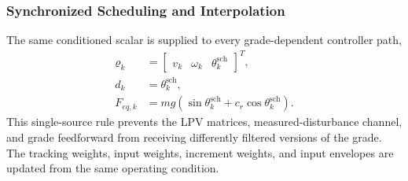 \documentclass{ieeeaccess}
\begin{document}
\subsubsection{Synchronized Scheduling and Interpolation}

The same conditioned scalar is supplied to every grade-dependent controller path,
\begin{equation}
\begin{aligned}
\boldsymbol\varrho_k
&=\begin{bmatrix}v_k&\omega_k&\theta^{\mathrm{sch}}_k\end{bmatrix}^{T},\\
d_k&=\theta^{\mathrm{sch}}_k,\\
F_{eq,k}&=mg\!\left(
\sin\theta^{\mathrm{sch}}_k+c_r\cos\theta^{\mathrm{sch}}_k
\right).
\end{aligned}
\label{eq:synchronized_slope}
\end{equation}
This single-source rule prevents the LPV matrices, measured-disturbance channel, and grade feedforward from receiving differently filtered versions of the grade. The tracking weights, input weights, increment weights, and input envelopes are updated from the same operating condition.
\end{document}
